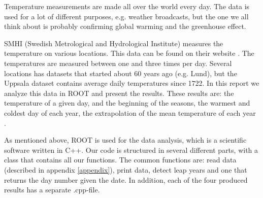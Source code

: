

Temperature measurements are made all over the world every day. The data is used for a lot of different purposes, e.g. weather broadcasts, but the one we all think about is probably confirming global warming and the greenhouse effect. 

SMHI (Swedish Metrological and Hydrological Institute) measures the temperature on various locations. This data can be found on their website \cite{smhidata}. The temperatures are measured between one and three times per day. Several locations has datasets that started about 60 years ago (e.g. Lund), but the Uppsala dataset contains average daily temperatures since 1722. In this report we analyze this data in ROOT and present the results. These results are: the temperature of a given day, and the beginning of the seasons, the warmest and coldest day of each year, the extrapolation of the mean temperature of each year . 

As mentioned above, ROOT is used for the data analysis, which is a scientific software written in C++. Our code is structured in several different parts, with a class that contains all our functions. The common functions are: read data (described in appendix \ref{appendix}), print data, detect leap years and one that returns the day number given the date. In addition, each of the four produced results has a separate .cpp-file. 


